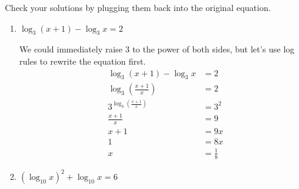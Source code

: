 \documentclass{article}
\providecommand{\check}{}
\renewcommand{\check}{\ifmmode{\text{ \ding{51} }}\else{\ding{51} }\fi}
\begin{document}
\begin{enumerate}[resume]
\begin{enumerate}

    \begin{problem}[\stretch{0.35}]
      \check Check your solutions by plugging them back into the original equation. 
    \end{problem}

  \end{enumerate}

  

  \pspace{\newpage}

  \begin{enumerate}[resume]
  \item


    \begin{problem}[\stretch{1.25}]
      $\log_3 (x + 1) - \log_3 x = 2$
    \end{problem}

    \begin{solution}
      We could immediately raise $3$ to the power of both sides,
      but let's use log rules to rewrite the equation first.
      \begin{align*}
        \log_3 (x + 1) - \log_3 x &= 2 \\
        \log_3(\tfrac{x+1}{x})&= 2 \\
        3^{\log_3(\tfrac{x+1}{x})} &= 3^2 \\
        \frac{x+1}{x} &= 9 \\
        x+1 &= 9x \\
        1 &= 8x \\
        x &= \boxed{\frac{1}{8}}
      \end{align*}
    \end{solution}

  \item \label{quadratic-in-log10-x}


    \begin{problem}[\vfill]
      $(\log_{10} x)^2 + \log_{10} x = 6$
    \end{problem}


\end{enumerate}
\end{enumerate}
\end{document}
